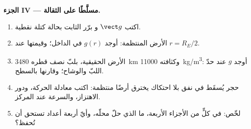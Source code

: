 \begin{problem}
\medskip
\noindent\textbf{الجزء IV ---  مسلَّطًا على الثقالة.}
\begin{enumerate}[resume]
  \item اكتب   $\vect g$ و
        برّر الثابت بحالة كتلة نقطية.
  \item الأرض المنتظمة: أوجد $g(r)$ في الداخل؛ وقيمتها عند $r = R_E/2$.
  \item الأرض الحقيقية، بلبّ نصف قطره \qty{3480}{km} وكثافته
        \qty{11000}{kg/m^3}: أوجد $g$ عند حدّ اللبّ والوشاح؛ وقارنها
        بالسطح.
  \item حجر يُسقَط في نفق بلا احتكاك يخترق أرضًا منتظمة:
        اكتب معادلة الحركة، ودور الاهتزاز، والسرعة عند
        المركز.
  \item لخّص: في كلٍّ من الأجزاء الأربعة، ما الذي حلّ  محلّه،
        وأيّ أربعة أعداد تستحق أن تُحفظ؟
\end{enumerate}
\end{problem}

